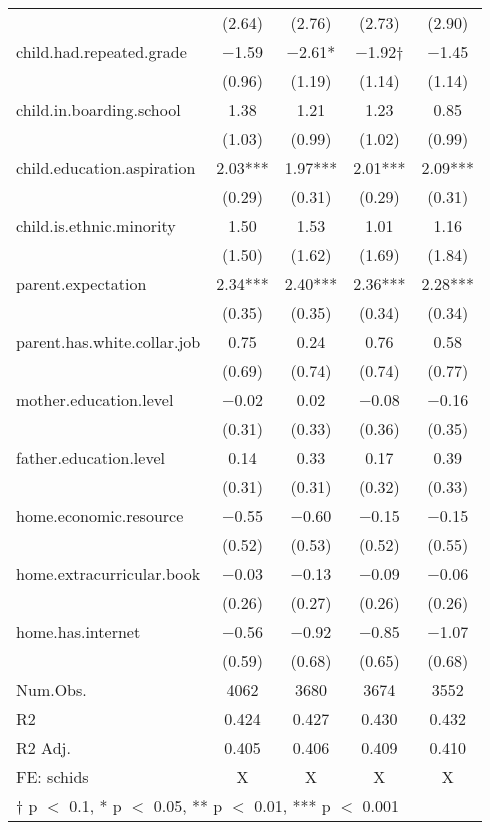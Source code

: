 \documentclass[
  man,floatsintext]{apa7}
\begin{document}
\begin{table}
\begin{tabular}[t]{lcccc}
 & (\num{2.64}) & (\num{2.76}) & (\num{2.73}) & (\num{2.90})\\
child.had.repeated.grade & \num{-1.59} & \num{-2.61}* & \num{-1.92}† & \num{-1.45}\\
 & (\num{0.96}) & (\num{1.19}) & (\num{1.14}) & (\num{1.14})\\
child.in.boarding.school & \num{1.38} & \num{1.21} & \num{1.23} & \num{0.85}\\
 & (\num{1.03}) & (\num{0.99}) & (\num{1.02}) & (\num{0.99})\\
child.education.aspiration & \num{2.03}*** & \num{1.97}*** & \num{2.01}*** & \num{2.09}***\\
 & (\num{0.29}) & (\num{0.31}) & (\num{0.29}) & (\num{0.31})\\
child.is.ethnic.minority & \num{1.50} & \num{1.53} & \num{1.01} & \num{1.16}\\
 & (\num{1.50}) & (\num{1.62}) & (\num{1.69}) & (\num{1.84})\\
parent.expectation & \num{2.34}*** & \num{2.40}*** & \num{2.36}*** & \num{2.28}***\\
 & (\num{0.35}) & (\num{0.35}) & (\num{0.34}) & (\num{0.34})\\
parent.has.white.collar.job & \num{0.75} & \num{0.24} & \num{0.76} & \num{0.58}\\
 & (\num{0.69}) & (\num{0.74}) & (\num{0.74}) & (\num{0.77})\\
mother.education.level & \num{-0.02} & \num{0.02} & \num{-0.08} & \num{-0.16}\\
 & (\num{0.31}) & (\num{0.33}) & (\num{0.36}) & (\num{0.35})\\
father.education.level & \num{0.14} & \num{0.33} & \num{0.17} & \num{0.39}\\
 & (\num{0.31}) & (\num{0.31}) & (\num{0.32}) & (\num{0.33})\\
home.economic.resource & \num{-0.55} & \num{-0.60} & \num{-0.15} & \num{-0.15}\\
 & (\num{0.52}) & (\num{0.53}) & (\num{0.52}) & (\num{0.55})\\
home.extracurricular.book & \num{-0.03} & \num{-0.13} & \num{-0.09} & \num{-0.06}\\
 & (\num{0.26}) & (\num{0.27}) & (\num{0.26}) & (\num{0.26})\\
home.has.internet & \num{-0.56} & \num{-0.92} & \num{-0.85} & \num{-1.07}\\
 & (\num{0.59}) & (\num{0.68}) & (\num{0.65}) & (\num{0.68})\\
\midrule
Num.Obs. & \num{4062} & \num{3680} & \num{3674} & \num{3552}\\
R2 & \num{0.424} & \num{0.427} & \num{0.430} & \num{0.432}\\
R2 Adj. & \num{0.405} & \num{0.406} & \num{0.409} & \num{0.410}\\
FE: schids & X & X & X & X\\
\bottomrule
\multicolumn{5}{l}{\rule{0pt}{1em}† p $<$ 0.1, * p $<$ 0.05, ** p $<$ 0.01, *** p $<$ 0.001}\\
\end{tabular}
\end{table}
\end{document}
